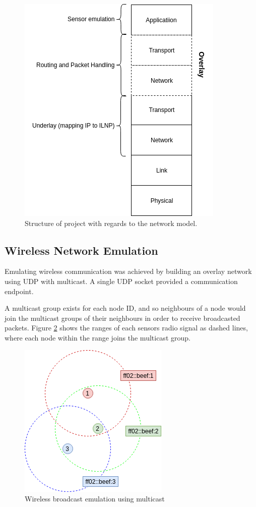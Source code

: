\documentclass[12pt]{article}
\begin{document}
\begin{figure}[!ht]
	\centering
	\includegraphics[width=0.7\linewidth]{images/layers}
	\caption{Structure of project with regards to the network model.}
	\label{fig:layers}
\end{figure}

\subsection{Wireless Network Emulation}

Emulating wireless communication was achieved by building an overlay network using UDP with multicast. A single UDP socket provided a communication endpoint.

A multicast group exists for each node ID, and so neighbours of a node would join the multicast groups of their neighbours in order to receive broadcasted packets. Figure \ref{fig:mcast} shows the ranges of each sensors radio signal as dashed lines, where each node within the range joins the multicast group.

\begin{figure}[!ht]
	\centering
	\includegraphics[width=0.5\linewidth]{images/mcast}
	\caption{Wireless broadcast emulation using multicast}
	\label{fig:mcast}
\end{figure}
\end{document}
